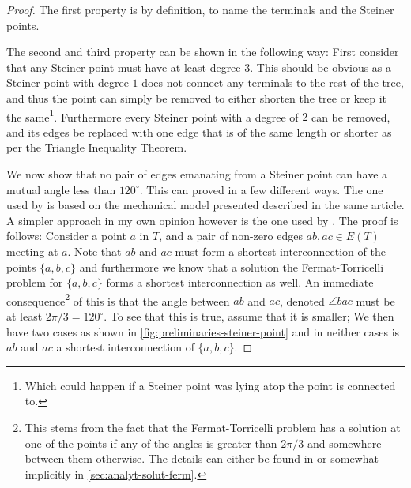 \begin{proof}
The first property is by definition, to name the terminals and the
Steiner points.

The second and third property can be shown in the following way: First consider
that any Steiner point must have at least degree $3$. This should be obvious as
a Steiner point with degree $1$ does not connect any terminals to the rest of
the tree, and thus the point can simply be removed to either shorten the tree or
keep it the same\footnote{Which could happen if a Steiner point was lying atop
  the point is connected to.}. Furthermore every Steiner point with a degree of
$2$ can be removed, and its edges be replaced with one edge that is of the same
length or shorter as per the Triangle Inequality
Theorem\cite{triangleinequality}.

We now show that no pair of edges emanating from a Steiner point can have a
mutual angle less than $120^{\circ}$. This can proved in a few different
ways. The one used by \textcite{gilbert1968} is based on the mechanical model
presented described in the same article. A simpler approach in my own opinion
however is the one used by \textcite{brazil2015}. The proof is follows: Consider
a point $a$ in $T$, and a pair of non-zero edges $ab, ac \in E(T)$ meeting at
$a$. Note that $ab$ and $ac$ must form a shortest interconnection of the points
$\{a, b, c\}$ and furthermore we know that a solution the Fermat-Torricelli
problem for $\{ a, b, c \}$ forms a shortest interconnection as well. An
immediate consequence\footnote{This stems from the fact that the
  Fermat-Torricelli problem has a solution at one of the points if any of the
  angles is greater than $2 \pi / 3$ and somewhere between them otherwise. The
  details can either be found in \textcite[ch.~1]{brazil2015} or somewhat
  implicitly in \cref{sec:analyt-solut-ferm}.} of this is that the angle between
$ab$ and $ac$, denoted $\angle bac$ must be at least $2 \pi / 3 = 120^{\circ}$.
To see that this is true, assume that it is smaller; We then have two cases as
shown in \cref{fig:preliminaries-steiner-point} and in neither cases is $ab$ and
$ac$ a shortest interconnection of $\{a, b, c\}$.
%
\end{proof}
